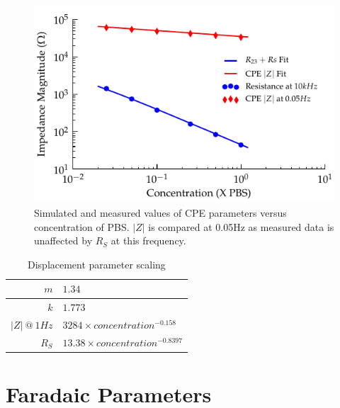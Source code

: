 \documentclass[10pt,final,journal]{IEEEtran}
\begin{document}
\begin{figure}
    \begin{center}
        \includegraphics{graphics/scalingFactors_Displacement_IEEE}
    \end{center}
    \caption{Simulated and measured values of CPE parameters versus concentration of PBS. $|Z|$ is compared at 0.05\thinspace Hz as measured data is unaffected by $R_{S}$ at this frequency.}
    \label{fig:CPE_Scaling}
\end{figure}

\begin{table}
    \begin{center}
        \begin{tabular}{|r|l|}
            \hline
            $m$ & $1.34$ \\ \hline
            $k$ & $1.773$\\ \hline
            $|Z|\: @\: 1Hz$& $3284 \times concentration^{-0.158}$ \\ \hline
            $R_{S}$ & $13.38 \times concentration^{-0.8397} $\\ \hline
        \end{tabular}
    \end{center}
    \caption{Displacement parameter scaling}
    \label{tab:CPEparams}
\end{table}

\section{Faradaic Parameters}
\end{document}

